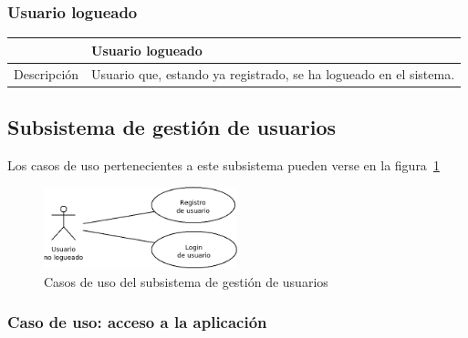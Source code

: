 \subsubsection{Usuario logueado}

\begin{center}
  \centering
  \begin{tabularx}{\textwidth}{|c|X|}
    \hline
     & Usuario logueado \\

    \hline

    Descripción & Usuario que, estando ya registrado, se ha logueado en el
    sistema. \\

    \hline
  \end{tabularx}
\end{center}


\subsection{Subsistema de gestión de usuarios}

Los casos de uso pertenecientes a este subsistema pueden verse en la
figura~\ref{fig:subsistema-usuarios}

\begin{figure}[hp]
  \centering
  \includegraphics[width=0.5\textwidth]{cap4/img/diagrama_subsistema_usuarios}
  \caption{Casos de uso del subsistema de gestión de usuarios}
  \label{fig:subsistema-usuarios}
\end{figure}

\subsubsection{Caso de uso: acceso a la aplicación}

